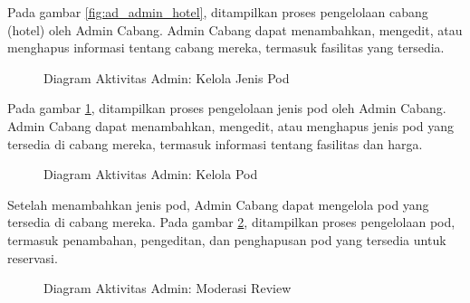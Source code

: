 Pada gambar \ref{fig:ad_admin_hotel}, ditampilkan proses pengelolaan cabang (hotel) oleh Admin Cabang. Admin Cabang dapat menambahkan, mengedit, atau menghapus informasi tentang cabang mereka, termasuk fasilitas yang tersedia.

\begin{figure}[H] %
    \centering
    \caption{Diagram Aktivitas Admin: Kelola Jenis Pod}
    \label{fig:ad_admin_podtype} %
\end{figure}

Pada gambar \ref{fig:ad_admin_podtype}, ditampilkan proses pengelolaan jenis pod oleh Admin Cabang. Admin Cabang dapat menambahkan, mengedit, atau menghapus jenis pod yang tersedia di cabang mereka, termasuk informasi tentang fasilitas dan harga.

\begin{figure}[H] %
    \centering
    \caption{Diagram Aktivitas Admin: Kelola Pod}
    \label{fig:ad_admin_pod} %
\end{figure}

Setelah menambahkan jenis pod, Admin Cabang dapat mengelola pod yang tersedia di cabang mereka. Pada gambar \ref{fig:ad_admin_pod}, ditampilkan proses pengelolaan pod, termasuk penambahan, pengeditan, dan penghapusan pod yang tersedia untuk reservasi.

\begin{figure}[H] %
    \centering
    \caption{Diagram Aktivitas Admin: Moderasi Review}
    \label{fig:ad_admin_review} %
\end{figure}

